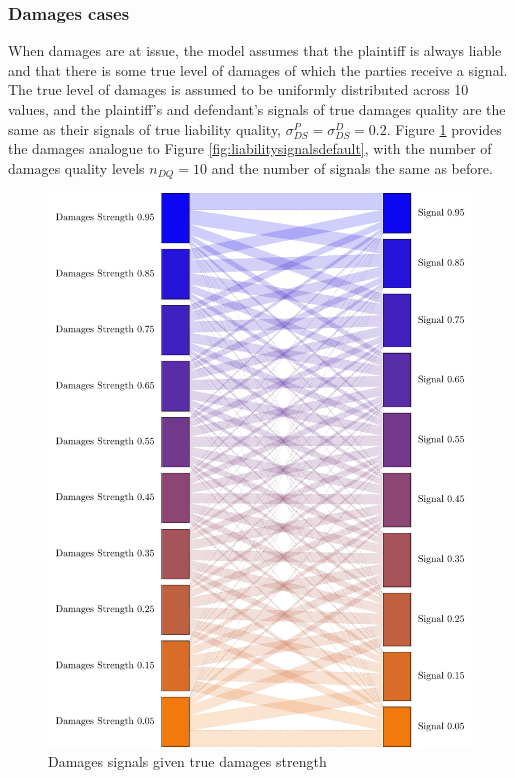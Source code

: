 \documentclass{article}
\begin{document}
\subsubsection{Damages cases}

When damages are at issue, the model assumes that the plaintiff is always liable and that there is some true level of damages of which the parties receive a signal. The true level of damages is assumed to be uniformly distributed across 10 values, and the plaintiff's and defendant's signals of true damages quality are the same as their signals of true liability quality, $\sigma_{DS}^P=\sigma_{DS}^D=0.2$. Figure \ref{fig:damagessignals} provides the damages analogue to Figure \ref{fig:liabilitysignalsdefault}, with the number of damages quality levels $n_{DQ} = 10$ and the number of signals the same as before.

\begin{figure}[h!]
\centering
\includegraphics[scale=0.4, trim={0in 0in 0in 0in}, clip]{../Figures/damages signals.pdf}
\caption{Damages signals given true damages strength}
\label{fig:damagessignals}
\end{figure}
\end{document}
